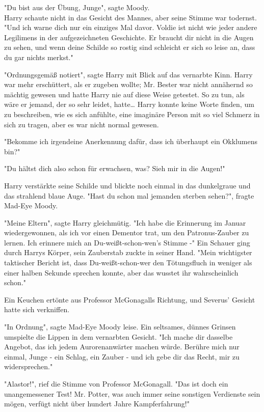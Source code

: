 {"Du bist aus der Übung, Junge", sagte Moody.\\ Harry schaute nicht in das Gesicht des Mannes, aber seine Stimme war todernst. "Und ich warne dich nur ein einziges Mal davor. Voldie ist nicht wie jeder andere Legilimens in der aufgezeichneten Geschichte. Er braucht dir nicht in die Augen zu sehen, und wenn deine Schilde so rostig sind schleicht er sich so leise an, dass du gar nichts merkst."

"Ordnungsgemäß notiert", sagte Harry mit Blick auf das vernarbte Kinn. Harry war mehr erschüttert, als er zugeben wollte; Mr. Bester war nicht annähernd so mächtig gewesen und hatte Harry nie auf diese Weise getestet. So zu tun, als wäre er jemand, der so sehr leidet, hatte… Harry konnte keine Worte finden, um zu beschreiben, wie es sich anfühlte, eine imaginäre Person mit so viel Schmerz in sich zu tragen, aber es war nicht normal gewesen.

"Bekomme ich irgendeine Anerkennung dafür, dass ich überhaupt ein Okklumens bin?"

"Du hältst dich also schon für erwachsen, was? Sieh mir in die Augen!"

Harry verstärkte seine Schilde und blickte noch einmal in das dunkelgraue und das strahlend blaue Auge. "Hast du schon mal jemanden sterben sehen?", fragte Mad-Eye Moody.

"Meine Eltern", sagte Harry gleichmütig. "Ich habe die Erinnerung im Januar wiedergewonnen, als ich vor einen Dementor trat, um den Patronus-Zauber zu lernen. Ich erinnere mich an Du-weißt-schon-wen's Stimme -" Ein Schauer ging durch Harrys Körper, sein Zauberstab zuckte in seiner Hand. "Mein wichtigster taktischer Bericht ist, dass Du-weißt-schon-wer den Tötungsfluch in weniger als einer halben Sekunde sprechen konnte, aber das wusstet ihr wahrscheinlich schon."

Ein Keuchen ertönte aus Professor McGonagalls Richtung, und Severus' Gesicht hatte sich verkniffen.

"In Ordnung", sagte Mad-Eye Moody leise. Ein seltsames, dünnes Grinsen umspielte die Lippen in dem vernarbten Gesicht. "Ich mache dir dasselbe Angebot, das ich jedem Aurorenanwärter machen würde. Berühre mich nur einmal, Junge - ein Schlag, ein Zauber - und ich gebe dir das Recht, mir zu widersprechen."

"Alastor!", rief die Stimme von Professor McGonagall. "Das ist doch ein unangemessener Test! Mr. Potter, was auch immer seine sonstigen Verdienste sein mögen, verfügt nicht über hundert Jahre Kampferfahrung!"

}
